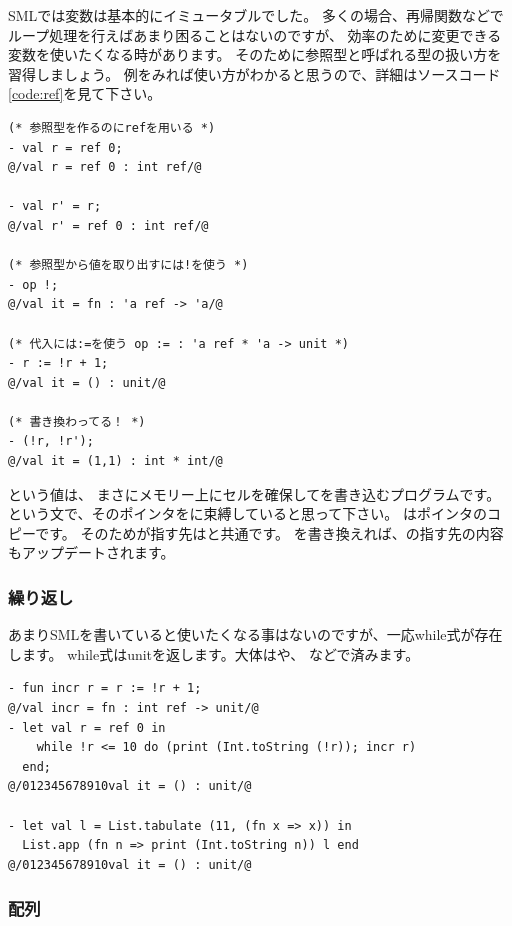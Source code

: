 \documentclass[11pt,a4paper]{jarticle}
\begin{document}
SMLでは変数は基本的にイミュータブルでした。
多くの場合、再帰関数などでループ処理を行えばあまり困ることはないのですが、
効率のために変更できる変数を使いたくなる時があります。
そのために参照型と呼ばれる型の扱い方を習得しましょう。
例をみれば使い方がわかると思うので、詳細はソースコード\ref{code:ref}を見て下さい。

\begin{lstlisting}[caption=ref型,label=code:ref]
(* 参照型を作るのにrefを用いる *)
- val r = ref 0;
@/val r = ref 0 : int ref/@

- val r' = r;
@/val r' = ref 0 : int ref/@

(* 参照型から値を取り出すには!を使う *)
- op !;
@/val it = fn : 'a ref -> 'a/@

(* 代入には:=を使う op := : 'a ref * 'a -> unit *)
- r := !r + 1;
@/val it = () : unit/@

(* 書き換わってる！ *)
- (!r, !r');
@/val it = (1,1) : int * int/@
\end{lstlisting}

という値は、
まさにメモリー上にセルを確保してを書き込むプログラムです。
という文で、そのポインタをに束縛していると思って下さい。
はポインタのコピーです。
そのためが指す先はと共通です。
を書き換えれば、の指す先の内容もアップデートされます。

\subsubsection{繰り返し}

あまりSMLを書いていると使いたくなる事はないのですが、一応while式が存在します。
while式はunitを返します。大体はや、
などで済みます。

\begin{lstlisting}[caption=while式,label=code:while]
- fun incr r = r := !r + 1;
@/val incr = fn : int ref -> unit/@
- let val r = ref 0 in
    while !r <= 10 do (print (Int.toString (!r)); incr r)
  end;
@/012345678910val it = () : unit/@

- let val l = List.tabulate (11, (fn x => x)) in
  List.app (fn n => print (Int.toString n)) l end
@/012345678910val it = () : unit/@
\end{lstlisting}

\subsubsection{配列}
\end{document}
